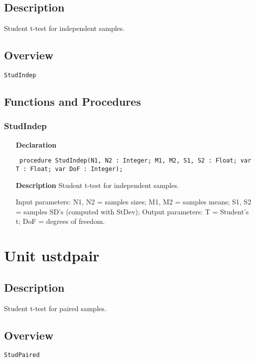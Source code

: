 \documentclass[12pt,a4paper,oneside]{report}
\newcommand{\declarationitem}[1]{\textbf{#1}}
\newcommand{\descriptiontitle}[1]{\textbf{#1}}
\newcommand{\code}[1]{\texttt{#1}}
\begin{document}
\subsection{Description}
Student t{-}test for independent samples. \subsection{Overview}
\begin{description}
	\item[\texttt{StudIndep}]
\end{description}
\subsection{Functions and Procedures}
\subsubsection{StudIndep}
\label{ustudind-StudIndep}
\begin{itemize}\item[\declarationitem{Declaration}\hfill]
	\begin{flushleft}
		\code{
			procedure StudIndep(N1, N2 : Integer; M1, M2, S1, S2 : Float; var T : Float; var DoF : Integer);}
	\end{flushleft}
	\item[\descriptiontitle{Description}]
	Student t{-}test for independent samples.
	
	Input parameters: N1, N2 = samples sizes; M1, M2 = samples means; S1, S2 = samples SD's (computed with StDev); Output parameters: T = Student's t; DoF = degrees of freedom.
	
\end{itemize}
\section{Unit ustdpair}
\label{ustdpair}
\subsection{Description}
Student t{-}test for paired samples. 
\subsection{Overview}
\begin{description}
	\item[\texttt{StudPaired}]
\end{description}
\end{document}

